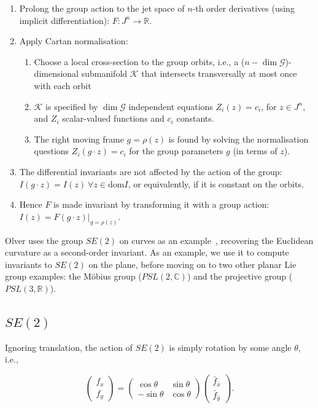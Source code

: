 \documentclass[review,onefignum,onetabnum]{siamonline190516}
\begin{document}
\begin{enumerate}
\item Prolong the group action to the jet space of $n$-th order derivatives (using implicit differentiation): $F: J^n \to \mathbb{R}$. 
\item Apply Cartan normalisation:
    \begin{enumerate}
    \item Choose a local cross-section to the group orbits, i.e., a ($n - \dim \mathcal{G}$)-dimensional submanifold $\mathcal{K}$ that intersects transversally at most once with each orbit
    \item $\mathcal{K}$ is specified by $\dim \mathcal{G}$ independent equations $Z_i (z) = c_i$, for $z \in J^n$,  and $Z_i$ scalar-valued functions and $c_i$ constants.
    \item The right moving frame $g = \rho(z)$ is found by solving the normalisation questions $Z_i (g \cdot z) = c_i$ for the group parameters $g$ (in terms of $z$).
    \end{enumerate}
\item The differential invariants are not affected by the action of the group: $I(g \cdot z) = I(z) \: \forall z \in \mathrm{dom} I$, or equivalently, if it is constant on the orbits. 
\item Hence $F$ is made invariant by transforming it with a group action: $I(z) = F(g \cdot z) |_{g=\rho(z)}$.  
\end{enumerate}

Olver uses the group $SE(2)$ on curves as an example~\cite{Olver}, recovering the Euclidean curvature as a second-order invariant. As an example, we use it to compute invariants to $SE(2)$ on the plane, before moving on to two other planar Lie group examples: the M\"obius group ($PSL(2,\mathbb{C})$) and the projective group ($PSL(3,\mathbb{R})$). 

\subsection{$SE(2)$}

Ignoring translation, the action of $SE(2)$ is simply rotation by some angle $\theta$, i.e., 

\begin{equation}
\left( \begin{array}{c} f_x \\ f_y \end{array} \right) = \left( \begin{array}{cc} \cos \theta & \sin \theta \\ - \sin \theta & \cos \theta \end{array} \right) \left( \begin{array}{c} \bar f_{\bar x} \\ \bar f_{\bar y} \end{array} \right).
\end{equation}
\end{document}
